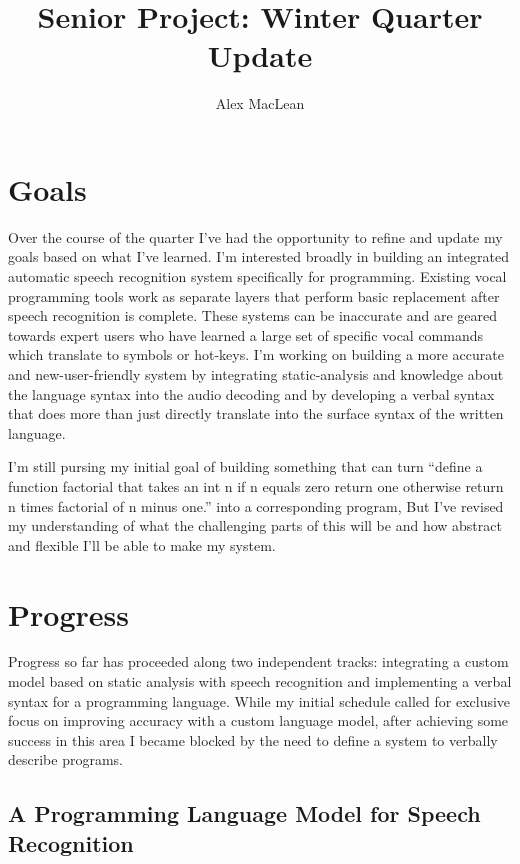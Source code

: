 \documentclass{article}
\title{Senior Project: Winter Quarter Update}
\author{Alex MacLean}
\begin{document}
\maketitle

\section{Goals}

Over the course of the quarter I've had the opportunity to refine and update my goals based on what I've learned. I'm interested broadly in building an integrated automatic speech recognition system specifically for programming. Existing vocal programming tools work as separate layers that perform basic replacement after speech recognition is complete. These systems can be inaccurate and are geared towards expert users who have learned a large set of specific vocal commands which translate to symbols or hot-keys. I'm working on building a more accurate and new-user-friendly system by integrating static-analysis and knowledge about the language syntax into the audio decoding and by developing a verbal syntax that does more than just directly translate into the surface syntax of the written language.

I'm still pursing my initial goal of building something that can turn ``define a function factorial that takes an int n if n equals zero return one otherwise return n times factorial of n minus one.'' into a corresponding program, But I've revised my understanding of what the challenging parts of this will be and how abstract and flexible I'll be able to make my system.

\section{Progress}

Progress so far has proceeded along two independent tracks: integrating a custom model based on static analysis with speech recognition and implementing a verbal syntax for a programming language. While my initial schedule called for exclusive focus on improving accuracy with a custom language model, after achieving some success in this area I became blocked by the need to define a system to verbally describe programs.

\subsection{A Programming Language Model for Speech Recognition}
\end{document}
